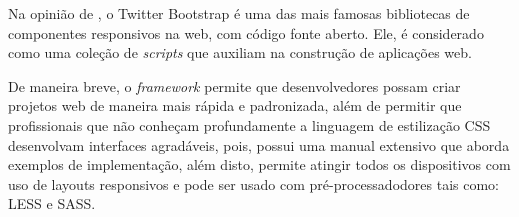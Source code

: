 Na opinião de , o \acs{Twitter
Bootstrap} é uma das mais famosas bibliotecas de componentes responsivos na web,
com código fonte aberto. Ele, é considerado como uma coleção de
\textit{scripts} que auxiliam na construção de aplicações web.

De maneira breve, o \textit{framework} permite que desenvolvedores possam criar
projetos web de maneira mais rápida e padronizada, além de permitir que
profissionais que não conheçam profundamente a linguagem de estilização 
\acs{CSS} desenvolvam interfaces agradáveis, pois, possui uma manual 
extensivo que aborda exemplos de implementação, além disto, permite atingir
todos os dispositivos com uso de layouts responsivos e pode ser usado com
pré-processadodores tais como: \ac{LESS} e \ac{SASS}.
